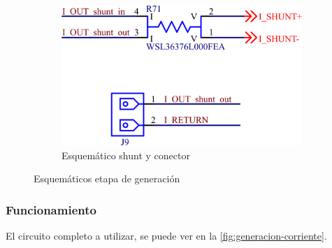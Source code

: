 \documentclass[../et.tex]{subfiles}
\begin{document}
\begin{figure}[!htbp]
  \begin{subfigure}[b]{0.4\textwidth}
    \centering
    \includegraphics[width=\textwidth]{../images/mosfet-shunt.png}
    \caption{Esquemático shunt y conector}
    \label{fig:mosfet-shunt}
    \vspace*{5mm}
  \end{subfigure}
  \label{fig:generacion}
  \caption{Esquemáticos etapa de generación}
\end{figure}

  \subsubsection{Funcionamiento}
  El circuito completo a utilizar, se puede ver en la \autoref{fig:generacion-corriente}.
\end{document}
